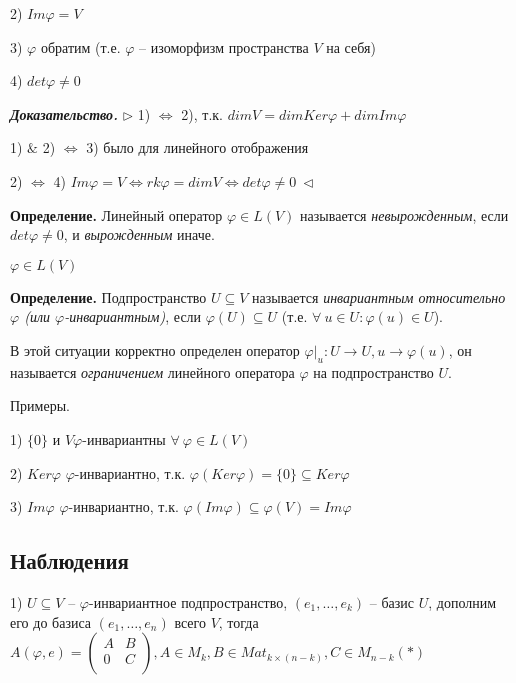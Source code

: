 2) $Im \varphi = V$

3) $\varphi$ обратим (т.е. $\varphi$ -- изоморфизм пространства $V$ на себя)

4) $det \varphi \neq 0$

\vspace{\baselineskip}
\textbf{\textit{Доказательство.}} $\rhd$ 1) $\Leftrightarrow$ 2), т.к. $dim V = dim Ker \varphi + dim Im \varphi$

1) $\&$ 2) $\Leftrightarrow$ 3) было для линейного отображения

2) $\Leftrightarrow$ 4) $Im \varphi = V \Leftrightarrow rk \varphi = dim V \Leftrightarrow det \varphi \neq 0 \ \lhd$

\vspace{\baselineskip}
\textbf{Определение.} Линейный оператор $\varphi \in L(V)$ называется \textit{невырожденным}, если $det \varphi \neq 0$, и \textit{вырожденным} иначе.

\vspace{\baselineskip}
$\varphi \in L(V)$

\textbf{Определение.} Подпространство $U \subseteq V$ называется \textit{инвариантным относительно $\varphi$ (или $\varphi$-инвариантным)}, если $\varphi(U) \subseteq U$ (т.е. $\forall \ u \in U: \varphi(u) \in U$).

В этой ситуации корректно определен оператор $\varphi |_u : U \rightarrow U, u \rightarrow \varphi(u)$, он называется \textit{ограничением} линейного оператора $\varphi$ на подпространство $U$.

\vspace{\baselineskip}
Примеры.

1) $\{0\}$ и $V \varphi$-инвариантны $\forall \ \varphi \in L(V)$

2) $Ker \varphi$ $\varphi$-инвариантно, т.к. $\varphi(Ker \varphi) = \{0\} \subseteq Ker \varphi$

3) $Im \varphi$ $\varphi$-инвариантно, т.к. $\varphi (Im \varphi) \subseteq \varphi (V) = Im \varphi$

\subsection{Наблюдения}

1) $U \subseteq V$ -- $\varphi$-инвариантное подпространство, $(e_1, \dots, e_k)$ -- базис $U$, дополним его до базиса $(e_1, \dots, e_n)$ всего $V$, тогда $A(\varphi, e) = \left(
\begin{array}{c|c}
  A & B  \\
  \hline
  0 & C  \\
\end{array}
\right), A \in M_k, B \in Mat_{k \times (n - k)}, C \in M_{n-k} (*)$

